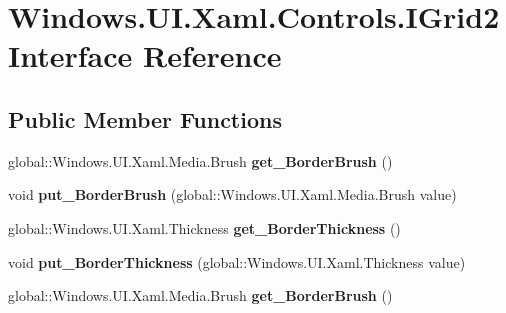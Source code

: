 \hypertarget{interface_windows_1_1_u_i_1_1_xaml_1_1_controls_1_1_i_grid2}{}\section{Windows.\+U\+I.\+Xaml.\+Controls.\+I\+Grid2 Interface Reference}
\label{interface_windows_1_1_u_i_1_1_xaml_1_1_controls_1_1_i_grid2}
\subsection*{Public Member Functions}
\begin{DoxyCompactItemize}
\item 
\mbox{\label{interface_windows_1_1_u_i_1_1_xaml_1_1_controls_1_1_i_grid2_a8ad45ad9fd4553c6dfdf276b103dd4f5}} 
global\+::\+Windows.\+U\+I.\+Xaml.\+Media.\+Brush {\bfseries get\+\_\+\+Border\+Brush} ()
\item 
\mbox{\label{interface_windows_1_1_u_i_1_1_xaml_1_1_controls_1_1_i_grid2_af4bf398df0a43ba5b9b4fcd3a31bb58a}} 
void {\bfseries put\+\_\+\+Border\+Brush} (global\+::\+Windows.\+U\+I.\+Xaml.\+Media.\+Brush value)
\item 
\mbox{\label{interface_windows_1_1_u_i_1_1_xaml_1_1_controls_1_1_i_grid2_aa6787459b59d92219e0bfdc4e595ce55}} 
global\+::\+Windows.\+U\+I.\+Xaml.\+Thickness {\bfseries get\+\_\+\+Border\+Thickness} ()
\item 
\mbox{\label{interface_windows_1_1_u_i_1_1_xaml_1_1_controls_1_1_i_grid2_a166919d21dd1a031ab3e7d2edc22938a}} 
void {\bfseries put\+\_\+\+Border\+Thickness} (global\+::\+Windows.\+U\+I.\+Xaml.\+Thickness value)
\item 
\mbox{\label{interface_windows_1_1_u_i_1_1_xaml_1_1_controls_1_1_i_grid2_a8ad45ad9fd4553c6dfdf276b103dd4f5}} 
global\+::\+Windows.\+U\+I.\+Xaml.\+Media.\+Brush {\bfseries get\+\_\+\+Border\+Brush} ()
\item 
\mbox{\label{interface_windows_1_1_u_i_1_1_xaml_1_1_controls_1_1_i_grid2_af4bf398df0a43ba5b9b4fcd3a31bb58a}} 

\end{DoxyCompactItemize}
